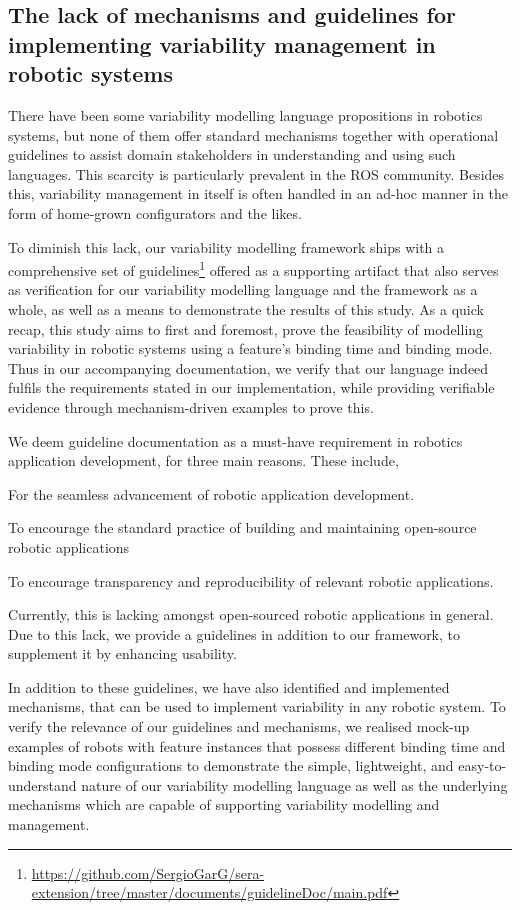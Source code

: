 \documentclass[conference]{IEEEtran}
\newcommand{\foot}[1]{\footnote{\url{#1}}}
\begin{document}
\subsection{The lack of mechanisms and guidelines for implementing variability management in robotic systems}
There have been some variability modelling language propositions in robotics systems, but none of them offer standard mechanisms together with operational guidelines to assist domain stakeholders in understanding and using such languages. This scarcity is particularly prevalent in the ROS community. Besides this, variability management in itself is often handled in an ad-hoc manner in the form of home-grown configurators and the likes.

To diminish this lack, our variability modelling framework ships with a comprehensive set of guidelines\foot{https://github.com/SergioGarG/sera-extension/tree/master/documents/guidelineDoc/main.pdf}
offered as a supporting artifact that also serves as verification for our variability modelling language and the framework as a whole, as well as a means to demonstrate the results of this study. As a quick recap, this study aims to first and foremost, prove the feasibility of modelling variability in robotic systems using a feature's binding time and binding mode.  Thus in our accompanying documentation, we verify that our language indeed fulfils the requirements stated in our implementation, while providing verifiable evidence through mechanism-driven examples to prove this.

We deem guideline documentation as a must-have requirement in robotics application development, for three main reasons. These include,
\begin{enumerate*}[label=(\roman*)]
	\item For the seamless advancement of robotic application development.
	\item To encourage the standard practice of building and maintaining open-source robotic applications
	\item To encourage transparency and reproducibility of relevant robotic applications.
\end{enumerate*} 
 Currently, this is lacking amongst open-sourced robotic applications in general. Due to this lack, we provide a guidelines in addition to our framework, to supplement it by enhancing usability.

In addition to these guidelines, we have also identified and implemented mechanisms, that can be used to implement variability in any robotic system. To verify the relevance of our guidelines and mechanisms, we realised mock-up examples of robots with feature instances that possess different binding time and binding mode configurations to demonstrate the simple, lightweight, and easy-to-understand nature of our variability modelling language as well as the underlying mechanisms which are capable of supporting variability modelling and management.
\end{document}
